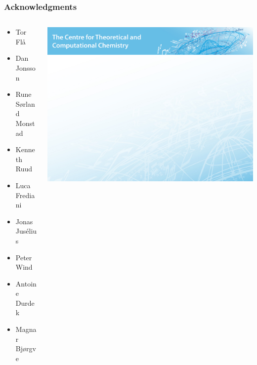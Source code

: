 \begin{frame}
    \frametitle{Acknowledgments}
    \large
    \begin{columns}
    \begin{column}[b]{0.5\linewidth}
    \begin{itemize}
    	\item Tor Fl{\aa}
    	\item Dan Jonsson
    	\item Rune S{\o}rland Monstad
        \item Kenneth Ruud
	\item Luca Frediani
    \end{itemize}

    \vspace{5mm}

    \begin{itemize}
    	\item Jonas Jus{\'e}lius
    	\item Peter Wind
	\item Antoine Durdek
    	\item Magnar Bj{\o}rgve
    \end{itemize}

    \vspace{5mm}

    \end{column}
    \begin{column}[b]{0.5\linewidth}
	\centering
	\includegraphics[scale=0.4, clip, viewport = 0 300 400 400]{figures/ctcc_forside.jpg}\\

        \vspace{10mm}


\end{column}
\end{columns}
\end{frame}
